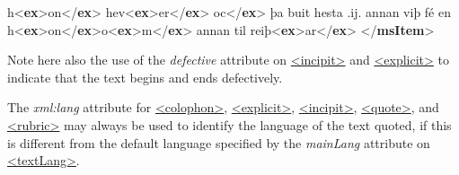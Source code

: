 \begin{shaded}
h{<\textbf{ex}>}on{</\textbf{ex}>} hev{<\textbf{ex}>}er{</\textbf{ex}>}\mbox{}\newline 
\hspace*{1em}oc{</\textbf{ex}>} þa buit hesta .ij.\mbox{}\newline 
{}annan viþ fé en h{<\textbf{ex}>}on{</\textbf{ex}>}o{<\textbf{ex}>}m{</\textbf{ex}>} annan til\mbox{}\newline 
\hspace*{1em}\hspace*{1em} reiþ{<\textbf{ex}>}ar{</\textbf{ex}>}\mbox{}\newline 
{}\mbox{}\newline 
{</\textbf{msItem}>}\end{shaded}\egroup\par \noindent  Note here also the use of the {\itshape defective} attribute on \hyperref[TEI.incipit]{<incipit>} and \hyperref[TEI.explicit]{<explicit>} to indicate that the text begins and ends defectively.\par
The {\itshape xml:lang} attribute for \hyperref[TEI.colophon]{<colophon>}, \hyperref[TEI.explicit]{<explicit>}, \hyperref[TEI.incipit]{<incipit>}, \hyperref[TEI.quote]{<quote>}, and \hyperref[TEI.rubric]{<rubric>} may always be used to identify the language of the text quoted, if this is different from the default language specified by the {\itshape mainLang} attribute on \hyperref[TEI.textLang]{<textLang>}.
